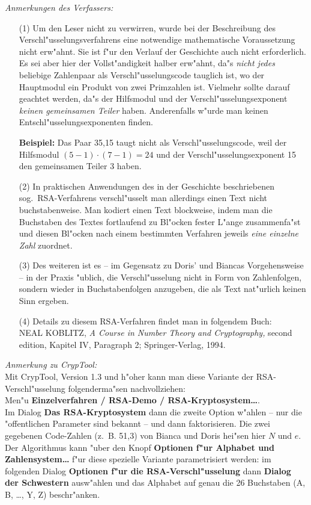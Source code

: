 \[\]
\[\]
\[\]
\[\]
\hrulefill
\[\]
\[\]
\emph{Anmerkungen des Verfassers:}
\begin{itemize}
\item[(1)] Um den Leser nicht zu verwirren, wurde bei der Beschreibung des
  Verschl"usselungsverfahrens eine notwendige mathematische Voraussetzung
  nicht erw"ahnt. Sie ist f"ur den Verlauf der Geschichte auch nicht
  erforderlich. Es sei aber hier der Vollst"andigkeit halber erw"ahnt, da"s
  \emph{nicht jedes} beliebige Zahlenpaar als Verschl"usselungscode
  tauglich ist, wo der Hauptmodul ein Produkt von zwei Primzahlen
  ist. Vielmehr sollte darauf geachtet werden, da"s der Hilfsmodul und der
  Verschl"usselungsexponent \emph{keinen gemeinsamen Teiler}
  haben. Anderenfalls w"urde man keinen Entschl"usselungsexponenten finden.

  \textbf{Beispiel:} Das Paar 35,15 taugt nicht als Verschl"usselungscode,
  weil der Hilfsmodul $(5-1)\cdot(7-1)=24$ und der
  Verschl"usselungsexponent 15 den gemeinsamen Teiler 3 haben.
\item[(2)] In praktischen Anwendungen des in der Geschichte beschriebenen
  sog.\ RSA-Verfahrens verschl"usselt man allerdings einen Text nicht
  buchstabenweise. Man kodiert einen Text blockweise, indem man die
  Buchstaben des Textes fortlaufend zu Bl"ocken fester L"ange zusammenfa"st
  und diesen Bl"ocken nach einem bestimmten Verfahren jeweils \emph{eine
    einzelne Zahl} zuordnet.
\item[(3)] Des weiteren ist es -- im Gegensatz zu Doris' und Biancas
  Vorgehensweise -- in der Praxis "ublich, die Verschl"usselung nicht in
  Form von Zahlenfolgen, sondern wieder in Buchstabenfolgen anzugeben, die
  als Text nat"urlich keinen Sinn ergeben.
\item[(4)] Details zu diesem RSA-Verfahren findet man in folgendem Buch:\\
  NEAL KOBLITZ, \emph{A Course in Number Theory and Cryptography,} second
  edition, Kapitel IV, Paragraph 2; Springer-Verlag, 1994.
\end{itemize}

\vspace{2cm}

\noindent\emph{Anmerkung zu CrypTool:}
\\
Mit CrypTool, Version 1.3 und h"oher kann man diese Variante der
RSA-Verschl"usselung folgenderma"sen nachvollziehen:
\\
Men"u \textbf{Einzelverfahren / RSA-Demo / RSA-Kryptosystem\dots}.
\\
Im Dialog \textbf{Das RSA-Kryptosystem} dann die zweite Option w"ahlen --
nur die "offentlichen Parameter sind bekannt -- und dann faktorisieren. Die
zwei gegebenen Code-Zahlen (z.~B. 51,3) von Bianca und Doris hei"sen hier
$N$ und $e$. Der Algorithmus kann "uber den Knopf \textbf{Optionen f"ur
  Alphabet und Zahlensystem\dots} f"ur diese spezielle Variante
parametrisiert werden: im folgenden Dialog \textbf{Optionen f"ur die
  RSA-Verschl"usselung} dann \textbf{Dialog der Schwestern} ausw"ahlen und
das Alphabet auf genau die 26 Buchstaben (A, B, \dots, Y, Z) beschr"anken.


